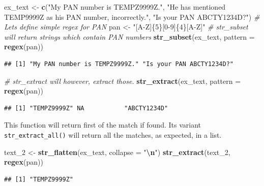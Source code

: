 \documentclass[
]{book}
\newenvironment{Shaded}{\begin{snugshade}}{\end{snugshade}}
\newcommand{\AttributeTok}[1]{\textcolor[rgb]{0.13,0.29,0.53}{#1}}
\newcommand{\CommentTok}[1]{\textcolor[rgb]{0.56,0.35,0.01}{\textit{#1}}}
\newcommand{\FunctionTok}[1]{\textcolor[rgb]{0.13,0.29,0.53}{\textbf{#1}}}
\newcommand{\NormalTok}[1]{#1}
\newcommand{\OtherTok}[1]{\textcolor[rgb]{0.56,0.35,0.01}{#1}}
\newcommand{\SpecialCharTok}[1]{\textcolor[rgb]{0.81,0.36,0.00}{\textbf{#1}}}
\newcommand{\StringTok}[1]{\textcolor[rgb]{0.31,0.60,0.02}{#1}}
\begin{document}
\begin{Shaded}
\begin{Highlighting}[]
\NormalTok{ex\_text }\OtherTok{\textless{}{-}} \FunctionTok{c}\NormalTok{(}\StringTok{"My PAN number is TEMPZ9999Z."}\NormalTok{,}
             \StringTok{"He has mentioned TEMP9999Z as his PAN number, incorrectly."}\NormalTok{,}
             \StringTok{"Is your PAN ABCTY1234D?"}\NormalTok{)}
\CommentTok{\# Let\textquotesingle{}s define simple regex for PAN}
\NormalTok{pan }\OtherTok{\textless{}{-}} \StringTok{"[A{-}Z]\{5\}[0{-}9]\{4\}[A{-}Z]"}
\CommentTok{\# str\_subset will return strings which contain PAN numbers}
\FunctionTok{str\_subset}\NormalTok{(ex\_text, }\AttributeTok{pattern =} \FunctionTok{regex}\NormalTok{(pan))}
\end{Highlighting}
\end{Shaded}

\begin{verbatim}
## [1] "My PAN number is TEMPZ9999Z." "Is your PAN ABCTY1234D?"
\end{verbatim}

\begin{Shaded}
\begin{Highlighting}[]
\CommentTok{\# str\_extract will however, extract those.}
\FunctionTok{str\_extract}\NormalTok{(ex\_text, }\AttributeTok{pattern =} \FunctionTok{regex}\NormalTok{(pan))}
\end{Highlighting}
\end{Shaded}

\begin{verbatim}
## [1] "TEMPZ9999Z" NA           "ABCTY1234D"
\end{verbatim}

This function will return first of the match if found. Its variant \texttt{str\_extract\_all()} will return all the matches, as expected, in a list.

\begin{Shaded}
\begin{Highlighting}[]
\NormalTok{text\_2 }\OtherTok{\textless{}{-}} \FunctionTok{str\_flatten}\NormalTok{(ex\_text, }\AttributeTok{collapse =} \StringTok{"}\SpecialCharTok{\textbackslash{}n}\StringTok{"}\NormalTok{)}
\FunctionTok{str\_extract}\NormalTok{(text\_2, }\FunctionTok{regex}\NormalTok{(pan))}
\end{Highlighting}
\end{Shaded}

\begin{verbatim}
## [1] "TEMPZ9999Z"
\end{verbatim}
\end{document}
